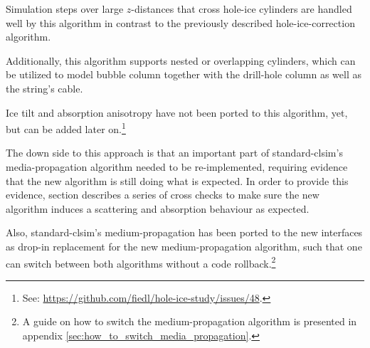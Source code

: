 Simulation steps over large $z$-distances that cross hole-ice cylinders are handled well by this algorithm in contrast to the previously described hole-ice-correction algorithm.

Additionally, this algorithm supports nested or overlapping cylinders, which can be utilized to model bubble column together with the drill-hole column as well as the string's cable.

Ice tilt and absorption anisotropy have not been ported to this algorithm, yet, but can be added later on.\footnote{See: \url{https://github.com/fiedl/hole-ice-study/issues/48}.}

The down side to this approach is that an important part of standard-clsim's media-propagation algorithm needed to be re-implemented, requiring evidence that the new algorithm is still doing what is expected. In order to provide this evidence, section  describes a series of cross checks to make sure the new algorithm induces a scattering and absorption behaviour as expected.

Also, standard-clsim's medium-propagation has been ported to the new interfaces as drop-in replacement for the new medium-propagation algorithm, such that one can switch between both algorithms without a code rollback.\footnote{A guide on how to switch the medium-propagation algorithm is presented in appendix \ref{sec:how_to_switch_media_propagation}.}



